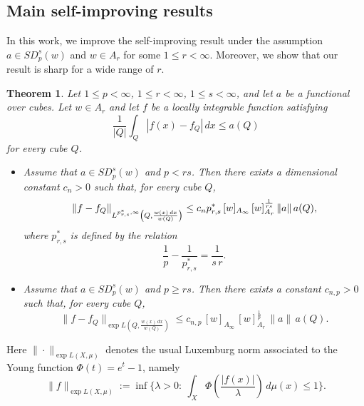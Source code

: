 \documentclass[reqno, 10pt, oneside]{amsart}
\numberwithin{equation}{section}
\newcommand{\strt}[1]{\rule{0pt}{#1}}
\newtheorem{theorem}{Theorem}
\numberwithin{theorem}{section}
\newcommand{\norm}[1]{\left\|#1\right\|}
\newcommand{\1}{{\rm 1\hspace*{-0.4ex}%
\rule{0.1ex}{1.52ex}\hspace*{0.2ex}}}
\begin{document}
		
\subsection{Main self-improving results}




In this work, we improve the self-improving result under the assumption $a \in SD_p^s(w)$ and $w \in A_r$ for some $1 \le r < \infty$. Moreover, we show that our result is sharp for a wide range of $r$.




\begin{theorem}\label{Selfimproving Ar}
	Let $1\le p<\infty$, $1\le r<\infty$, $1\le s<\infty$, and let $a$ be a functional over cubes. Let $w\in A_r$ and let $f$ be a locally integrable function satisfying
	\begin{equation}\label{starting-point0}
		\frac{1}{|Q|}\int_Q |f(x)-f_Q|\,dx \le a(Q)
	\end{equation}
	for every cube $Q$.
	
	\begin{itemize}
		\item Assume that $a\in SD_p^s(w)$ and $p<rs$. Then there exists a dimensional constant $c_n>0$ such that, for every cube $Q$,
		\begin{equation}\label{Thm Ar eq}
			\norm{f-f_Q}_{\strt{2.3ex} L^{p_{r,s}^{*},\infty}\left(Q, \frac{w(x)\,dx}{w(Q)}\right)}
			\le
			c_n p_{r,s}^{*}\,[w]_{A_\infty}\,[w]_{A_r}^{\frac{1}{rs}}\,
			\|a\|\,a(Q),
		\end{equation}
		where $p_{r,s}^{*}$ is defined by the relation
		\begin{equation*}
			\frac{1}{p}-\frac{1}{p_{r,s}^{*}}=\frac{1}{s\, r}.
		\end{equation*}
		
		\item Assume that $a\in SD_p^s(w)$ and $p\ge rs$. Then there exists a constant $c_{n,p}>0$ such that, for every cube $Q$,
		\begin{equation}\label{Thm Ar eq p>s}
			\|f-f_Q\|_{\exp L\left(Q,\frac{w(x)\,dx}{w(Q)}\right)}
			\le
			c_{n,p}\,[w]_{A_\infty}\,[w]_{A_r}^{\frac1p}\,
			\|a\|\,a(Q).
		\end{equation}
	\end{itemize}
\end{theorem}

Here $\|\cdot\|_{\exp L(X,\mu)}$ denotes the usual Luxemburg norm associated to the Young function $\Phi(t)=e^{t}-1$, namely
\begin{equation*}
\|f\|_{\exp L(X,\mu)} :=\inf\Big\{\lambda>0:\ \int_X \Phi\!\left(\frac{|f(x)|}{\lambda}\right)\,d\mu(x)\le 1\Big\}. 
\end{equation*}
\end{document}
